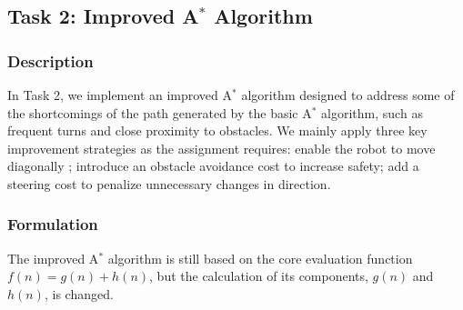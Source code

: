 \documentclass[aps,letterpaper,10pt]{revtex4}
\begin{document}
\newpage
\subsection{Task 2: Improved A$^*$ Algorithm}
\subsubsection{Description}
In Task 2, we implement an improved A$^*$ algorithm designed to address some of the shortcomings of the path generated by the basic A$^*$ algorithm, such as frequent turns and close proximity to obstacles. We mainly apply three key improvement strategies as the assignment requires: enable the robot to move diagonally ; introduce an obstacle avoidance cost to increase safety; add a steering cost to penalize unnecessary changes in direction.

\subsubsection{Formulation}
The improved A$^*$ algorithm is still based on the core evaluation function $f(n) = g(n) + h(n)$, but the calculation of its components, $g(n)$ and $h(n)$, is changed.
\end{document}
